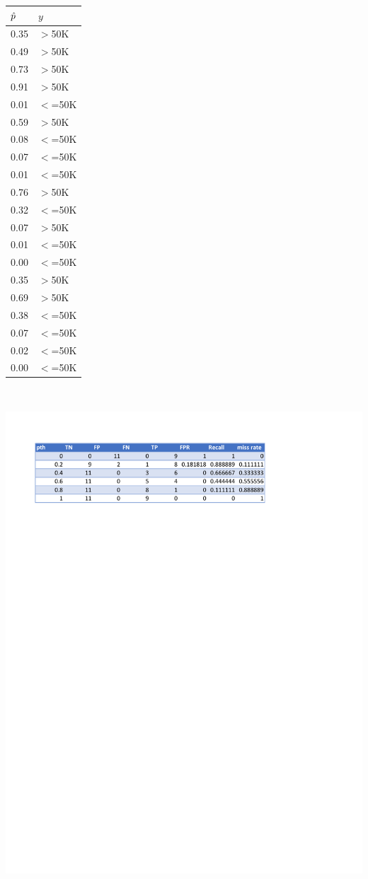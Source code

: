 \documentclass[12pt]{article}
\begin{document}
\begin{enumerate}
{\begin{table}[ht]
\footnotesize
\hspace{2cm}\begin{tabular}{ll}
  \hline
$\hat{p}$ & $y$ \\ 
  \hline
0.35 & $>$50K \\ 
  0.49 & $>$50K \\ 
  0.73 & $>$50K \\ 
  0.91 & $>$50K \\ 
  0.01 & $<$=50K \\ 
  0.59 & $>$50K \\ 
  0.08 & $<$=50K \\ 
  0.07 & $<$=50K \\ 
  0.01 & $<$=50K \\ 
  0.76 & $>$50K \\ 
  0.32 & $<$=50K \\ 
  0.07 & $>$50K \\ 
  0.01 & $<$=50K \\ 
  0.00 & $<$=50K \\ 
  0.35 & $>$50K \\ 
  0.69 & $>$50K \\ 
  0.38 & $<$=50K \\ 
  0.07 & $<$=50K \\ 
  0.02 & $<$=50K \\ 
  0.00 & $<$=50K \\ 
   \hline
\end{tabular}
\end{table}
}~

\includegraphics[trim=1cm 20cm 0cm 0cm ]{hw5t.pdf}


\end{enumerate}
\end{document}
